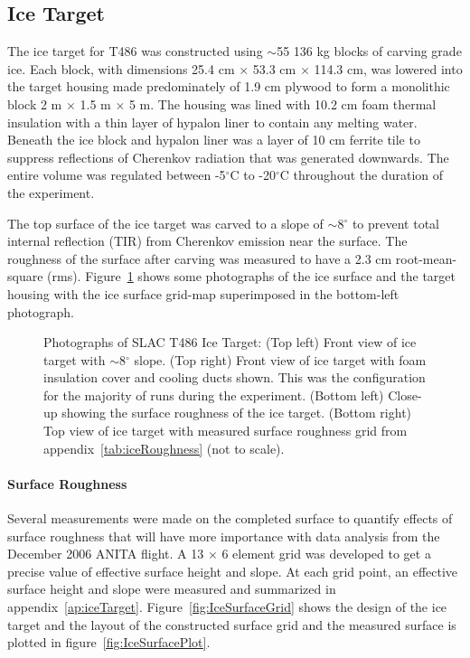 \subsection{Ice Target}
\label{ss:iceTarget}
The ice target for T486 was constructed using $\sim$55 136 kg blocks of carving grade ice.  Each block, with dimensions 25.4 cm $\times$ 53.3 cm $\times$ 114.3 cm, was lowered into the target housing made predominately of 1.9 cm plywood to form a monolithic block 2 m $\times$ 1.5 m $\times$ 5 m.  The housing was lined with 10.2 cm foam thermal insulation with a thin layer of hypalon liner to contain any melting water.  Beneath the ice block and hypalon liner was a layer of 10 cm ferrite tile to suppress reflections of Cherenkov radiation that was generated downwards.  The entire volume was regulated between -5$^\circ$C to -20$^\circ$C throughout the duration of the experiment.

\par The top surface of the ice target was carved to a slope of $\sim$8$^\circ$ to prevent total internal reflection (TIR) from Cherenkov emission near the surface.  The roughness of the surface after carving was measured to have a 2.3 cm root-mean-square (rms).  Figure~\ref{fig:icePhotos} shows some photographs of the ice surface and the target housing with the ice surface grid-map superimposed in the bottom-left photograph.

\begin{figure}[htbp]
\centering
\epsfxsize=4.5in
\caption{Photographs of SLAC T486 Ice Target:  (Top left) Front view of ice target with $\sim$8$^\circ$ slope.  (Top right) Front view of ice target with foam insulation cover and cooling ducts shown.  This was the configuration for the majority of runs during the experiment.  (Bottom left) Close-up showing the surface roughness of the ice target.  (Bottom right) Top view of ice target with measured surface roughness grid from appendix~\ref{tab:iceRoughness} (not to scale).}
\label{fig:icePhotos}
\end{figure}

\paragraph{Surface Roughness}
% 
%
Several measurements were made on the completed surface to quantify effects of surface roughness that will have more importance with data analysis from the December 2006 ANITA flight.  A 13 $\times$ 6 element grid was developed to get a precise value of effective surface height and slope.  At each grid point, an effective surface height and slope were measured and summarized in appendix~\ref{ap:iceTarget}.  Figure~\ref{fig:IceSurfaceGrid} shows the design of the ice target and the layout of the constructed surface grid and the measured surface is plotted in figure~\ref{fig:IceSurfacePlot}.

